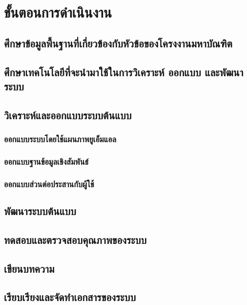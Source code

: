 \documentclass[a4paper]{article}
\begin{document}
\section{ขั้นตอนการดำเนินงาน}
\subsection{ศึกษาข้อมูลพื้นฐานที่เกี่ยวข้องกับหัวข้อของโครงงานมหาบัณฑิต}
\subsection{ศึกษาเทคโนโลยีที่จะนํามาใช้ในการวิเคราะห์ ออกแบบ และพัฒนาระบบ}
\subsection{วิเคราะห์และออกแบบระบบต้นแบบ}
\subsubsection{ออกแบบระบบโดยใช้แผนภาพยูเอ็มแอล}
\subsubsection{ออกแบบฐานข้อมูลเชิงสัมพันธ์}
\subsubsection{ออกแบบส่วนต่อประสานกับผู้ใช้}
\subsection{พัฒนาระบบต้นแบบ}
\subsection{ทดสอบและตรวจสอบคุณภาพของระบบ}
\subsection{เขียนบทความ}
\subsection{เรียบเรียงและจัดทําเอกสารของระบบ}
\end{document}
